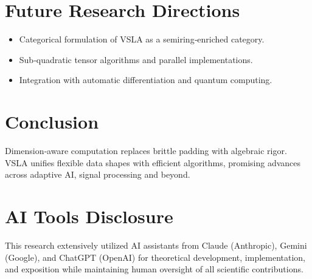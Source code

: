 \documentclass[11pt]{article}
\begin{document}
\section{Future Research Directions}
\begin{itemize}[leftmargin=1.5em]
  \item Categorical formulation of VSLA as a semiring‑enriched category.
  \item Sub‑quadratic tensor algorithms and parallel implementations.
  \item Integration with automatic differentiation and quantum computing.
\end{itemize}

\clearpage
\section{Conclusion}
Dimension‑aware computation replaces brittle padding with algebraic rigor.  VSLA unifies flexible data shapes with efficient algorithms, promising advances across adaptive AI, signal processing and beyond.

\section*{AI Tools Disclosure}

This research extensively utilized AI assistants from Claude (Anthropic), Gemini (Google), and ChatGPT (OpenAI) for theoretical development, implementation, and exposition while maintaining human oversight of all scientific contributions.
\end{document}
